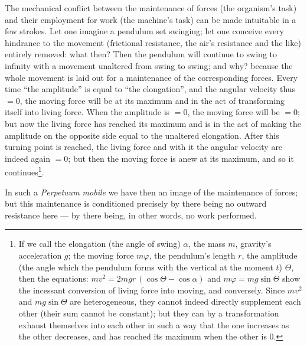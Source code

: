 \documentclass[12pt,a4paper]{book}
\begin{document}
The mechanical conflict between the maintenance of forces (the organism's task) and
their employment for work (the machine's task) can be made intuitable in a few
strokes. Let one imagine a pendulum set swinging; let one conceive every hindrance
to the movement (frictional resistance, the air's resistance and the like) entirely
removed: what then? Then the pendulum will continue to swing to infinity with a
movement unaltered from swing to swing; and why? because the whole movement is laid
out for a maintenance of the corresponding forces. Every time ``the amplitude'' is
equal to ``the elongation'', and the angular velocity thus $= 0$, the moving force
will be at its maximum and in the act of transforming itself into living force. When
the amplitude is $= 0$, the moving force will be $= 0$; but now the living force has
reached its maximum and is in the act of making the amplitude on the opposite side
equal to the unaltered elongation. After this turning point is reached, the living
force and with it the angular velocity are indeed again $= 0$; but then the moving
force is anew at its maximum, and so it continues\footnote{If we call the elongation
(the angle of swing) $\alpha$, the mass $m$, gravity's acceleration $g$; the moving
force $m\varphi$, the pendulum's length $r$, the amplitude (the angle which the
pendulum forms with the vertical at the moment $t$) $\Theta$, then the equations:
$mv^2 = 2mgr\,(\cos\Theta - \cos\alpha)$ and
$m\varphi = mg\sin\Theta$
show the incessant conversion of living force into moving, and conversely. Since
$mv^2$ and $mg\sin\Theta$ are heterogeneous, they cannot indeed directly supplement
each other (their sum cannot be constant); but they can by a transformation exhaust
themselves into each other in such a way that the one increases as the other
decreases, and has reached its maximum when the other is 0.}.

\setcounter{footnote}{0}
In such a \textit{Perpetuum mobile} we have then an image of the maintenance of
forces; but this maintenance is conditioned precisely by there being no outward
resistance here --- by there being, in other words, no work performed.
\end{document}
